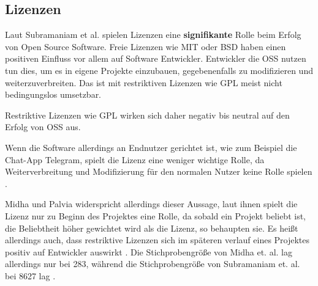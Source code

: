 \subsection{Lizenzen}


    


Laut Subramaniam et al. spielen Lizenzen eine \textbf{signifikante} Rolle beim Erfolg von 
Open Source Software.
Freie Lizenzen wie MIT oder BSD haben einen positiven Einfluss vor allem auf Software Entwickler.
Entwickler die OSS nutzen tun dies, um es in eigene Projekte einzubauen, gegebenenfalls zu modifizieren
und weiterzuverbreiten. Das ist mit restriktiven Lizenzen wie GPL meist nicht bedingungslos umsetzbar.

Restriktive Lizenzen wie GPL wirken sich daher negativ bis neutral auf den Erfolg von OSS aus.

Wenn die Software allerdings an Endnutzer
gerichtet ist, wie zum Beispiel die Chat-App Telegram, spielt die Lizenz eine weniger wichtige Rolle, 
da Weiterverbreitung und Modifizierung
für den normalen Nutzer keine Rolle spielen \cite{subramaniamDeterminantsOpenSource2009}.

Midha und Palvia widerspricht allerdings dieser Aussage, laut ihnen spielt die Lizenz nur zu Beginn
des Projektes eine Rolle, da sobald ein Projekt beliebt ist, die Beliebtheit höher gewichtet wird als
die Lizenz, so behaupten sie.
Es heißt allerdings auch, dass restriktive Lizenzen sich im späteren verlauf eines Projektes positiv
auf Entwickler auswirkt \cite{midhaFactorsAffectingSuccess2012}. %
Die Stichprobengröße von Midha et. al. lag allerdings nur bei 283, %
während die Stichprobengröße von Subramaniam et. al. bei 
8627 lag \cite{subramaniamDeterminantsOpenSource2009}. %


